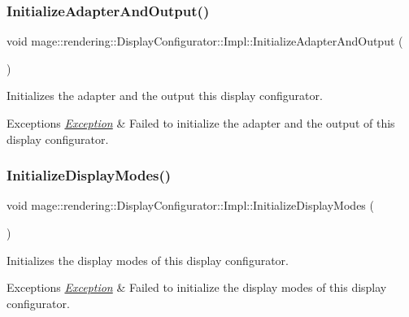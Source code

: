 \subsubsection{\texorpdfstring{Initialize\+Adapter\+And\+Output()}{InitializeAdapterAndOutput()}}
{\footnotesize\ttfamily void mage\+::rendering\+::\+Display\+Configurator\+::\+Impl\+::\+Initialize\+Adapter\+And\+Output (\begin{DoxyParamCaption}{ }\end{DoxyParamCaption})\hspace{0.3cm}{\ttfamily [private]}}

Initializes the adapter and the output this display configurator.


\begin{DoxyExceptions}{Exceptions}
{\em \hyperlink{classmage_1_1_exception}{Exception}} & Failed to initialize the adapter and the output of this display configurator. \\
\hline
\end{DoxyExceptions}
\hypertarget{classmage_1_1rendering_1_1_display_configurator_1_1_impl_a1fe26330e7c488af6fbe8f0c4a8c3286}{}\label{classmage_1_1rendering_1_1_display_configurator_1_1_impl_a1fe26330e7c488af6fbe8f0c4a8c3286} 
\subsubsection{\texorpdfstring{Initialize\+Display\+Modes()}{InitializeDisplayModes()}}
{\footnotesize\ttfamily void mage\+::rendering\+::\+Display\+Configurator\+::\+Impl\+::\+Initialize\+Display\+Modes (\begin{DoxyParamCaption}{ }\end{DoxyParamCaption})\hspace{0.3cm}{\ttfamily [private]}}

Initializes the display modes of this display configurator.


\begin{DoxyExceptions}{Exceptions}
{\em \hyperlink{classmage_1_1_exception}{Exception}} & Failed to initialize the display modes of this display configurator. \\
\hline
\end{DoxyExceptions}
\hypertarget{classmage_1_1rendering_1_1_display_configurator_1_1_impl_afaffb2c4689dd48c195d2a7f12c11e0b}{}\label{classmage_1_1rendering_1_1_display_configurator_1_1_impl_afaffb2c4689dd48c195d2a7f12c11e0b} 

